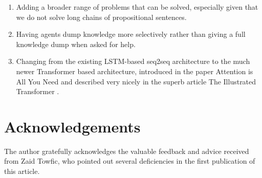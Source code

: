 \documentclass{article}
\begin{document}
\begin{enumerate}
	\item Adding a broader range of problems that can be solved, especially given that we do not solve long chains of propositional sentences.
	\item Having agents dump knowledge more selectively rather than giving a full knowledge dump when asked for help.
	\item Changing from the existing LSTM-based seq2seq architecture to the much newer Transformer based architecture, introduced in the paper Attention is All You Need \cite{attention_is_all_you_need} and described very nicely in the superb article The Illustrated Transformer \cite{transformer}.
\end{enumerate}

\section{Acknowledgements}

The author gratefully acknowledges the valuable feedback and advice received from Zaid Towfic, who pointed out several deficiencies in the first publication of this article.




\end{document}
